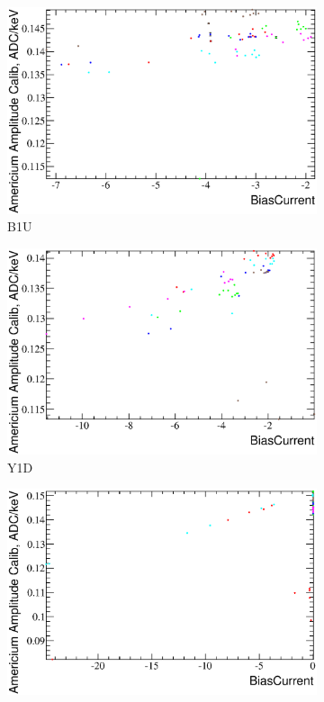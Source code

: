\documentclass[a4paper,12pt]{article}
\begin{document}
\begin{figure}[h]
\begin{subfigure}[b]{0.5\textwidth}
\includegraphics[width=\textwidth]{gfx/run12_alpha/B1U/c_hBiasCurrent_AmGain.eps}
\caption{B1U}
\end{subfigure}
\begin{subfigure}[b]{0.5\textwidth}
\includegraphics[width=\textwidth]{gfx/run12_alpha/Y1D/c_hBiasCurrent_AmGain.eps}
\caption{Y1D}
\end{subfigure}
%
\begin{subfigure}[b]{0.5\textwidth}
\includegraphics[width=\textwidth]{gfx/run12_alpha/B2D/c_hBiasCurrent_AmGain.eps}

\end{subfigure}
\end{figure}
\end{document}
